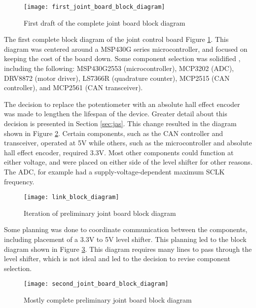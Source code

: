 \begin{figure}[H]
	\centering
	\texttt{[image: first\_joint\_board\_block\_diagram]}
	\caption{First draft of the complete joint board block diagram}
	\label{fig:1st_joint_board_block}
\end{figure}

\noindent The first complete block diagram of the joint control board Figure \ref{fig:1st_joint_board_block}. This diagram was centered around a MSP430G series microcontroller, and focused on keeping the cost of the board down. Some component selection was solidified , including the following: MSP430G2553 (microcontroller), MCP3202 (ADC), DRV8872 (motor driver), LS7366R (quadrature counter), MCP2515 (CAN controller), and MCP2561 (CAN transceiver). 

\noindent The decision to replace the potentiometer with an absolute hall effect encoder was made to lengthen the lifespan of the device. Greater detail about this decision is presented in Section \ref{sec:jas}. This change resulted in the diagram shown in Figure \ref{fig:nice_prelim_joint_board_block}. Certain components, such as the CAN controller and transceiver, operated at 5V while others, such as the microcontroller and absolute hall effect encoder, required 3.3V. Most other components could function at either voltage, and were placed on either side of the level shifter for other reasons. The ADC, for example had a supply-voltage-dependent maximum SCLK frequency.
\begin{figure}[H]
	\centering
	\texttt{[image: link\_block\_diagram]}
	\caption{Iteration of preliminary joint board block diagram}
	\label{fig:nice_prelim_joint_board_block}
\end{figure}

\noindent Some planning was done to coordinate communication between the components, including placement of a 3.3V to 5V level shifter. This planning led to the block diagram shown in Figure \ref{fig:2nd_joint_board_block}. This diagram requires many lines to pass through the level shifter, which is not ideal and led to the decision to revise component selection.

\begin{figure}[H]
	\centering
	\texttt{[image: second\_joint\_board\_block\_diagram]}
	\caption{Mostly complete preliminary joint board block diagram}
	\label{fig:2nd_joint_board_block}
\end{figure}

